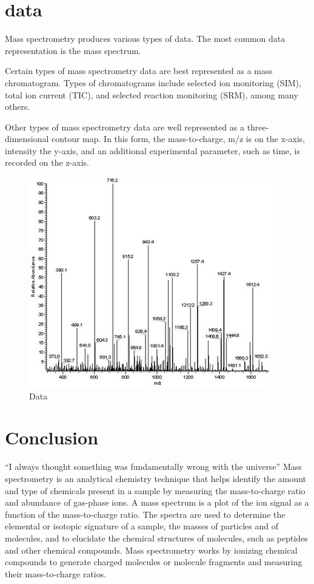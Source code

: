 \documentclass{article}
\begin{document}
\section{data}
Mass spectrometry produces various types of data. The most common data representation is the mass spectrum.

Certain types of mass spectrometry data are best represented as a mass chromatogram. Types of chromatograms include selected ion monitoring (SIM), total ion current (TIC), and selected reaction monitoring (SRM), among many others.

Other types of mass spectrometry data are well represented as a three-dimensional contour map. In this form, the mass-to-charge, m/z is on the x-axis, intensity the y-axis, and an additional experimental parameter, such as time, is recorded on the z-axis.


\begin{figure}[h!]
\centering
\includegraphics[scale=0.8]{image_preview.jpg}
\caption{Data}
\label{fig:Principle}
\end{figure}



\section{Conclusion}
``I always thought something was fundamentally wrong with the universe'' 
Mass spectrometry is an analytical chemistry technique that helps identify the amount and type of chemicals present in a sample by measuring the mass-to-charge ratio and abundance of gas-phase ions.
A mass spectrum is a plot of the ion signal as a function of the mass-to-charge ratio. The spectra are used to determine the elemental or isotopic signature of a sample, the masses of particles and of molecules, and to elucidate the chemical structures of molecules, such as peptides and other chemical compounds. Mass spectrometry works by ionizing chemical compounds to generate charged molecules or molecule fragments and measuring their mass-to-charge ratios.


\citep{adams1995hitchhiker}



\end{document}
